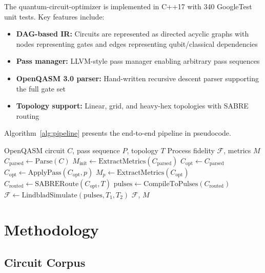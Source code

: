 \documentclass[journal]{IEEEtran}
\newcommand{\fid}{\mathcal{F}}
\begin{document}
The quantum-circuit-optimizer is implemented in C++17 with 340 GoogleTest unit tests. Key features include:

\begin{itemize}
    \item \textbf{DAG-based IR:} Circuits are represented as directed acyclic graphs with nodes representing gates and edges representing qubit/classical dependencies
    \item \textbf{Pass manager:} LLVM-style pass manager enabling arbitrary pass sequences
    \item \textbf{OpenQASM 3.0 parser:} Hand-written recursive descent parser supporting the full gate set
    \item \textbf{Topology support:} Linear, grid, and heavy-hex topologies with SABRE routing
\end{itemize}

Algorithm~\ref{alg:pipeline} presents the end-to-end pipeline in pseudocode.

\begin{algorithm}[t]
\caption{End-to-End Fidelity Analysis Pipeline}
\label{alg:pipeline}
\begin{algorithmic}[1]
\Require OpenQASM circuit $C$, pass sequence $P$, topology $T$
\Ensure Process fidelity $\fid$, metrics $M$
\State $C_{\text{parsed}} \gets \text{Parse}(C)$
\State $M_{\text{init}} \gets \text{ExtractMetrics}(C_{\text{parsed}})$
\State $C_{\text{opt}} \gets C_{\text{parsed}}$
    \State $C_{\text{opt}} \gets \text{ApplyPass}(C_{\text{opt}}, p)$
    \State $M_p \gets \text{ExtractMetrics}(C_{\text{opt}})$
\EndFor
\State $C_{\text{routed}} \gets \text{SABRERoute}(C_{\text{opt}}, T)$
\State $\text{pulses} \gets \text{CompileToPulses}(C_{\text{routed}})$
\State $\fid \gets \text{LindbladSimulate}(\text{pulses}, T_1, T_2)$
\State \Return $\fid$, $M$
\end{algorithmic}
\end{algorithm}

\section{Methodology}
\label{sec:methodology}

\subsection{Circuit Corpus}
\end{document}
